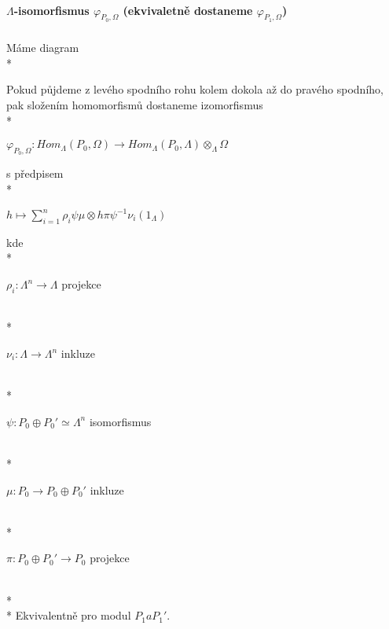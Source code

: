\documentclass[7pt]{article}
\begin{document}
     \paragraph{$\Lambda$-isomorfismus $\varphi_{P_0,\Omega}$ (ekvivaletně dostaneme $\varphi_{P_1,\Omega}$)} 
         \subparagraph{} Máme diagram \\*          
         \centerline{ }       
         Pokud půjdeme z levého spodního rohu kolem dokola 
         až do pravého spodního, pak složením homomorfismů dostaneme izomorfismus \\*
         \centerline{$\varphi_{P_0,\Omega}:Hom_\Lambda(P_0,\Omega)\rightarrow Hom_\Lambda(P_0,\Lambda)\otimes_\Lambda \Omega$} 
         s předpisem \\*
         \centerline{$h\mapsto\sum_{i=1}^n \rho_i\psi\mu\otimes h\pi\psi^{-1}\nu_i(1_\Lambda)$}
         kde \\*
         \centerline{$ \rho_i: \Lambda^n\rightarrow\Lambda $ projekce} \\*
         \centerline{$ \nu_i: \Lambda\rightarrow \Lambda^n $ inkluze} \\*
         \centerline{$ \psi: P_0\oplus P_0' \simeq \Lambda^n $ isomorfismus} \\*
         \centerline{$ \mu: P_0\rightarrow P_0\oplus P_0'$ inkluze} \\*
         \centerline{$ \pi: P_0\oplus P_0'\rightarrow P_0$ projekce} \\* \\*
         Ekvivalentně pro modul $P_1 a P_1'$.
         
\end{document}

